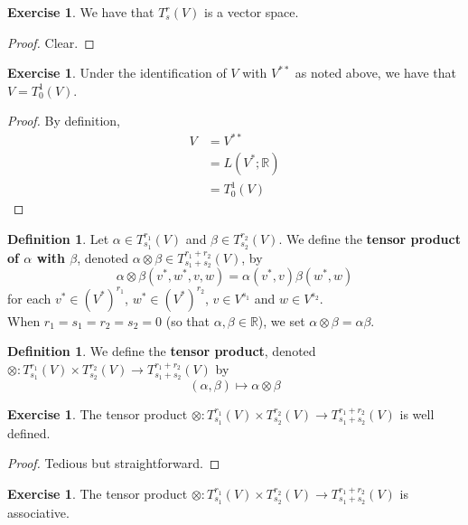 \documentclass{book}
\theoremstyle{definition}
\newtheorem{defn}[definition]{Definition}
\newtheorem{ex}[definition]{Exercise}
\newcommand{\al}{\alpha}
\newcommand{\be}{\beta}
\newcommand{\R}{\mathbb{R}}
\DeclareMathOperator*{\0}{\mbf{0}}
\DeclareMathOperator*{\1}{\mbf{1}}
\newcommand{\Tn}[1]{T^{r_{#1}}_{s_{#1}}(V)}
\newcommand{\Tnp}{T^{r_1 + r_2}_{s_1 + s_2}(V)}
\begin{document}
	\begin{ex}
		We have that $T^r_s(V)$ is a vector space. 
	\end{ex}

	\begin{proof}
		Clear.
	\end{proof}
	
	\begin{ex}
	Under the identification of $V$ with $V^{**}$ as noted above, we have that $V = T^1_0(V)$. 
	\end{ex}
	
	\begin{proof}
	By definition,
	\begin{align*}
	V 
	&= V^{**} \\
	&= L(V^*; \R) \\
	&= T^1_0(V)
	\end{align*}
	\end{proof}
	
	\begin{defn}
	Let $\al \in \Tn{1}$ and $\be \in \Tn{2}$. We define the \textbf{tensor product of $\al$ with $\be$}, denoted $\al \otimes \be \in T^{r_1+r_2}_{s_1+s_2}(V)$, by $$\al \otimes \be (v^*, w^*, v, w) = \al(v^*, v) \be(w^*, w)$$ for each $v^* \in (V^*)^{r_1}$, $w^* \in (V^*)^{r_2}$, $v \in V^{s_1}$ and $w \in V^{s_2}$.\\
	When $r_1=s_1=r_2=s_2= 0$ (so that $\al, \be \in \R$), we set $\al \otimes \be = \al \be$.
	\end{defn}
	
	\begin{defn}
	We define the \textbf{tensor product}, denoted $\otimes : \Tn{1} \times  \Tn{2} \rightarrow \Tnp$ by $$(\al, \be) \mapsto \al \otimes \be $$   
	\end{defn}
	
	\begin{ex}
	The tensor product $\otimes : \Tn{1} \times  \Tn{2} \rightarrow \Tnp$ is well defined. 
	\end{ex}
	
	\begin{proof}
	Tedious but straightforward.
\end{proof}	
	
	\begin{ex}
	The tensor product $\otimes : \Tn{1} \times  \Tn{2} \rightarrow \Tnp$ is associative. 
	\end{ex}
	
\end{document}
